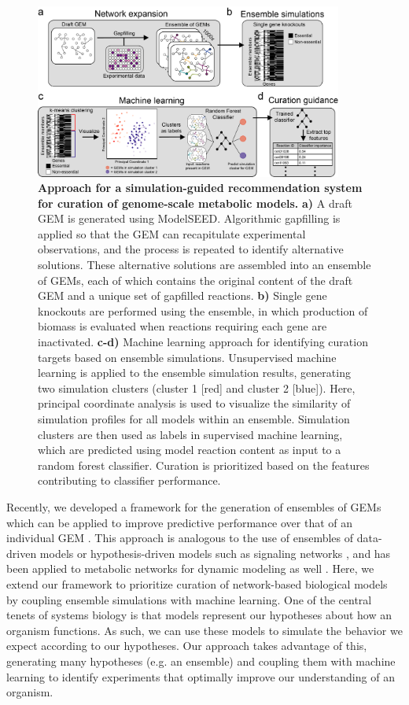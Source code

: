 \documentclass[11pt,onecolumn,notitlepage,openany,twoside]{book}
\begin{document}
\begin{refsection}
\begin{figure}[tb]
\centering
\includegraphics[width=0.9\textwidth]{ch3_fig1}
\caption[ Approach for a simulation-guided recommendation system for curation of genome-scale metabolic models.]{\textbf{ Approach for a simulation-guided recommendation system for curation of genome-scale metabolic models.} \textbf{a)} A draft GEM is generated using ModelSEED. Algorithmic gapfilling is applied so that the GEM can recapitulate experimental observations, and the process is repeated to identify alternative solutions. These alternative solutions are assembled into an ensemble of GEMs, each of which contains the original content of the draft GEM and a unique set of gapfilled reactions. \textbf{b)} Single gene knockouts are performed using the ensemble, in which production of biomass is evaluated when reactions requiring each gene are inactivated. \textbf{c-d)} Machine learning approach for identifying curation targets based on ensemble simulations. Unsupervised machine learning is applied to the ensemble simulation results, generating two simulation clusters (cluster 1 [red] and cluster 2 [blue]). Here, principal coordinate analysis is used to visualize the similarity of simulation profiles for all models within an ensemble. Simulation clusters are then used as labels in supervised machine learning, which are predicted using model reaction content as input to a random forest classifier. Curation is prioritized based on the features contributing to classifier performance.}
\end{figure}

Recently, we developed a framework for the generation of ensembles of GEMs which can be applied to improve predictive performance over that of an individual GEM \cite{Biggs2017-md}. This approach is analogous to the use of ensembles of data-driven models \cite{Dietterich2000-dq} or hypothesis-driven models such as signaling networks \cite{Kuepfer2007-gq}, and has been applied to metabolic networks for dynamic modeling as well \cite{Tran2008-pt}. Here, we extend our framework to prioritize curation of network-based biological models by coupling ensemble simulations with machine learning. One of the central tenets of systems biology is that models represent our hypotheses about how an organism functions. As such, we can use these models to simulate the behavior we expect according to our hypotheses. Our approach takes advantage of this, generating many hypotheses (e.g. an ensemble) and coupling them with machine learning to identify experiments that optimally improve our understanding of an organism.


\end{refsection}
\end{document}
